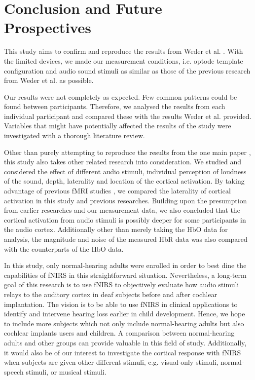 \chapter{Conclusion and Future Prospectives}
This study aims to confirm and reproduce the results from Weder et al. \citeyearpar {Weder2018}. With the limited devices, we made our measurement conditions, i.e. optode template configuration and audio sound stimuli as similar as those of the previous research from Weder et al. \citeyearpar{Weder2018} as possible.

Our results were not completely as expected. Few common patterns could be found between participants. Therefore,  we analysed the results from each individual participant and compared these with the results Weder et al. \citeyearpar{Weder2018} provided. Variables that might have potentially affected the results of the study were investigated with a thorough literature review.

Other than purely attempting to reproduce the results from the one main paper \citep{Weder2018}, this study also takes other related research into consideration.  We studied and considered the effect of different audio stimuli, individual perception of loudness of the sound, depth, laterality and location of the cortical activation. By taking advantage of previous fMRI studies \citep{Belin2000} \citep{Belin2002} \citep{Hall} \citep{Frost1999-vs}, we compared the laterality of cortical activation in this study and previous researches. Building upon the presumption from earlier researches and our measurement data, we also concluded that the cortical activation from audio stimuli is possibly deeper for some participants in the audio cortex. Additionally other than merely taking the HbO data for analysis, the magnitude and noise of the measured HbR data was also compared with the counterparts of the HbO data.

In this study, only normal-hearing adults were enrolled in order to best dine the capabilities of fNIRS in this straightforward situation. Nevertheless, a long-term goal of this research is to use fNIRS to objectively evaluate how audio stimuli relays to the auditory cortex in deaf subjects before and after cochlear implantation. The vision is to be able to use fNIRS in clinical applications to identify and intervene hearing loss earlier in child development. Hence, we hope to include more subjects which not only include normal-hearing adults but also cochlear implants users and children. A comparison between normal-hearing adults and other groups can provide valuable in this field of study. Additionally, it would also be of our interest to investigate the cortical response with fNIRS when subjects are given other different stimuli, e.g. visual-only stimuli, normal-speech stimuli, or musical stimuli.